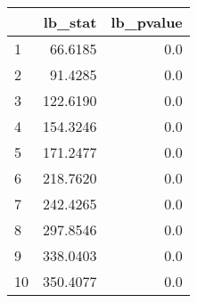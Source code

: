 \begin{tabular}{lrr}
\toprule
{} &   lb\_stat &  lb\_pvalue \\
\midrule
1  &   66.6185 &        0.0 \\
2  &   91.4285 &        0.0 \\
3  &  122.6190 &        0.0 \\
4  &  154.3246 &        0.0 \\
5  &  171.2477 &        0.0 \\
6  &  218.7620 &        0.0 \\
7  &  242.4265 &        0.0 \\
8  &  297.8546 &        0.0 \\
9  &  338.0403 &        0.0 \\
10 &  350.4077 &        0.0 \\
\bottomrule
\end{tabular}
